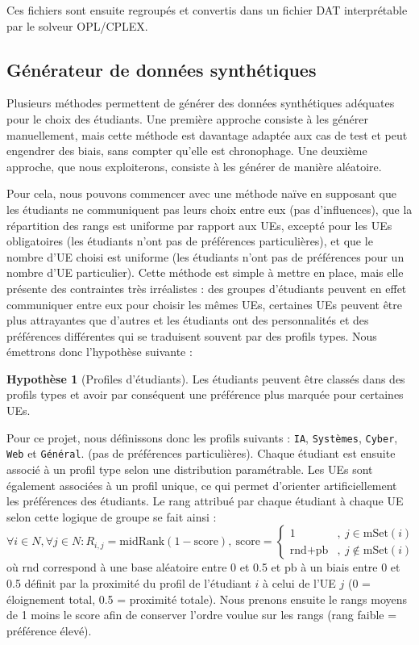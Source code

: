 \documentclass{rapport}
\theoremstyle{definition}
\theoremstyle{remark}
\theoremstyle{plain}
\theoremstyle{definition}
\theoremstyle{definition}
\theoremstyle{remark}
\theoremstyle{definition}
\newtheorem*{Hypothesis}{Hypothèse}
\begin{document}
Ces fichiers sont ensuite regroupés et convertis dans un fichier DAT interprétable par le solveur OPL/CPLEX.

\subsection{Générateur de données synthétiques}
Plusieurs méthodes permettent de générer des données synthétiques adéquates pour le choix des étudiants. Une première approche consiste à les générer manuellement, mais cette méthode est davantage adaptée aux cas de test et peut engendrer des biais, sans compter qu'elle est chronophage.
Une deuxième approche, que nous exploiterons, consiste à les générer de manière aléatoire.

Pour cela, nous pouvons commencer avec une méthode naïve en supposant que les étudiants ne communiquent pas leurs choix entre eux (pas d'influences), que la répartition des rangs est uniforme par rapport aux UEs, excepté pour les UEs obligatoires (les étudiants n'ont pas de préférences particulières), et que le nombre d'UE choisi est uniforme (les étudiants n'ont pas de préférences pour un nombre d'UE particulier).
Cette méthode est simple à mettre en place, mais elle présente des contraintes très irréalistes : des groupes d'étudiants peuvent en effet communiquer entre eux pour choisir les mêmes UEs, certaines UEs peuvent être plus attrayantes que d'autres et les étudiants ont des personnalités et des préférences différentes qui se traduisent souvent par des profils types. Nous émettrons donc l'hypothèse suivante :

\begin{Hypothesis}[Profiles d'étudiants]
    Les étudiants peuvent être classés dans des profils types et avoir par conséquent une préférence plus marquée pour certaines UEs.
\end{Hypothesis}

Pour ce projet, nous définissons donc les profils suivants : \texttt{IA}, \texttt{Systèmes}, \texttt{Cyber}, \texttt{Web} et \texttt{Général}. (pas de préférences particulières). Chaque étudiant est ensuite associé à un profil type selon une distribution paramétrable. Les UEs sont également associées à un profil unique, ce qui permet d'orienter artificiellement les préférences des étudiants.
Le rang attribué par chaque étudiant à chaque UE selon cette logique de groupe se fait ainsi :
$$
    \forall i\in N, \forall j\in N : R_{i,j} = \text{midRank}(1-\text{score}),\ \text{score}=\begin{cases}
    1&,\ j\in\text{mSet}(i)\\
    \text{rnd}+\text{pb}&,\ j\not\in\text{mSet}(i)
    \end{cases}
$$
où $\text{rnd}$ correspond à une base aléatoire entre 0 et 0.5 et $\text{pb}$ à un biais entre 0 et 0.5 définit par la proximité du profil de l'étudiant $i$ à celui de l'UE $j$ (0 = éloignement total, 0.5 = proximité totale).
Nous prenons ensuite le rangs moyens de 1 moins le score afin de conserver l'ordre voulue sur les rangs (rang faible = préférence élevé).
\end{document}
